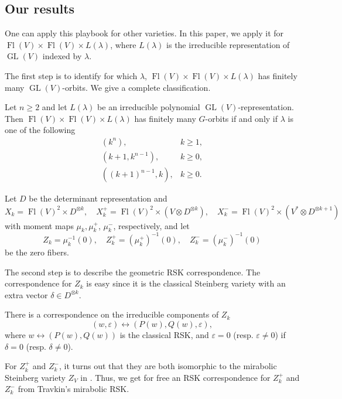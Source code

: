\documentclass[12pt,a4paper]{article}
\def\Fl{\operatorname{Fl}}
\def\GL{\operatorname{GL}}
\def\FlVV{\Fl(V) \times \Fl(V)}
\theoremstyle{plain}
\newenvironment{repthm}[1]
  {\renewcommand\theinnercustomthm{#1}\innercustomthm}
  {\endinnercustomthm}
\theoremstyle{definition}
\theoremstyle{remark}
\newcommand{\eps}{\varepsilon}
\begin{document}
\subsection{Our results}

    One can apply this playbook for other varieties. In this paper, we apply it for $\FlVV \times L(\lambda)$, where $L(\lambda)$ is the irreducible representation of $\GL(V)$ indexed by $\lambda$.

    The first step is to identify for which $\lambda$, $\FlVV\times L(\lambda)$ has finitely many $\GL(V)$-orbits. We give a complete classification.

    \begin{repthm}{\ref{thm:classify}}
        Let $n\geq 2$ and let $L(\lambda)$ be an irreducible polynomial $\GL(V)$-representation. Then $\FlVV\times L(\lambda)$ has finitely many $G$-orbits if and only if $\lambda$ is one of the following
        \[
        \begin{array}{ll}
        (k^n),& k\geq1,\\
        (k+1,k^{n-1}),& k\geq0,\\
        ((k+1)^{n-1},k),& k\geq0.
        \end{array}
        \]
    \end{repthm}

    Let $D$ be the determinant representation and
    \[
    X_k = \Fl(V)^2 \times D^{\otimes k},\quad
    X^+_k = \Fl(V)^2 \times (V\otimes D^{\otimes k}),\quad
    X^-_k = \Fl(V)^2 \times (V^*\otimes D^{\otimes k+1})
    \]
    with moment maps $\mu_k,\mu^+_k$, $\mu^-_k$, respectively, and let
    \[
    Z_k = \mu_k^{-1}(0),\quad Z^+_k = (\mu^+_k)^{-1}(0),\quad Z^-_k = (\mu^-_k)^{-1}(0)
    \]
    be the zero fibers.
    
    The second step is to describe the geometric RSK correspondence. The correspondence for $Z_k$ is easy since it is the classical Steinberg variety with an extra vector $\delta \in D^{\otimes k}$.

    \begin{repthm}{\ref{thm:DkRSK}}
        There is a correspondence on the irreducible components of $Z_k$
        \[
        (w,\eps)\longleftrightarrow (P(w),Q(w),\eps),
        \]
        where $w\longleftrightarrow (P(w),Q(w))$ is the classical RSK, and $\eps = 0$ (resp. $\eps \neq 0$) if $\delta = 0$ (resp. $\delta \neq 0$).
    \end{repthm}

    For $Z^+_k$ and $Z^-_k$, it turns out that they are both isomorphic to the mirabolic Steinberg variety $Z_V$ in \cite{travkin2009mirabolic}. Thus, we get for free an RSK correspondence for $Z^+_k$ and $Z^-_k$ from Travkin's mirabolic RSK.
\end{document}
